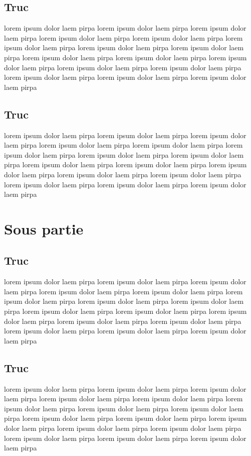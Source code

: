 \documentclass[11pt,fleqn]{book}
\begin{document}
\subsection{Truc}
lorem  ipsum  dolor  laem  pirpa  lorem  ipsum  dolor  laem  pirpa  lorem  ipsum  dolor  laem  pirpa  lorem  ipsum  dolor  laem  pirpa  lorem  ipsum  dolor  laem  pirpa  lorem  ipsum  dolor  laem  pirpa  lorem  ipsum  dolor  laem  pirpa  lorem  ipsum  dolor  laem  pirpa  lorem  ipsum  dolor  laem  pirpa  lorem  ipsum  dolor  laem  pirpa  lorem  ipsum  dolor  laem  pirpa  lorem  ipsum  dolor  laem  pirpa  lorem  ipsum  dolor  laem  pirpa  lorem  ipsum  dolor  laem  pirpa  lorem  ipsum  dolor  laem  pirpa  lorem  ipsum  dolor  laem  pirpa 
~\\
\subsection{Truc}
lorem  ipsum  dolor  laem  pirpa  lorem  ipsum  dolor  laem  pirpa  lorem  ipsum  dolor  laem  pirpa  lorem  ipsum  dolor  laem  pirpa  lorem  ipsum  dolor  laem  pirpa  lorem  ipsum  dolor  laem  pirpa  lorem  ipsum  dolor  laem  pirpa  lorem  ipsum  dolor  laem  pirpa  lorem  ipsum  dolor  laem  pirpa  lorem  ipsum  dolor  laem  pirpa  lorem  ipsum  dolor  laem  pirpa  lorem  ipsum  dolor  laem  pirpa  lorem  ipsum  dolor  laem  pirpa  lorem  ipsum  dolor  laem  pirpa  lorem  ipsum  dolor  laem  pirpa  lorem  ipsum  dolor  laem  pirpa 
~\\
\section{Sous partie}
\subsection{Truc}
lorem  ipsum  dolor  laem  pirpa  lorem  ipsum  dolor  laem  pirpa  lorem  ipsum  dolor  laem  pirpa  lorem  ipsum  dolor  laem  pirpa  lorem  ipsum  dolor  laem  pirpa  lorem  ipsum  dolor  laem  pirpa  lorem  ipsum  dolor  laem  pirpa  lorem  ipsum  dolor  laem  pirpa  lorem  ipsum  dolor  laem  pirpa  lorem  ipsum  dolor  laem  pirpa  lorem  ipsum  dolor  laem  pirpa  lorem  ipsum  dolor  laem  pirpa  lorem  ipsum  dolor  laem  pirpa  lorem  ipsum  dolor  laem  pirpa  lorem  ipsum  dolor  laem  pirpa  lorem  ipsum  dolor  laem  pirpa 
~\\
\subsection{Truc}
lorem  ipsum  dolor  laem  pirpa  lorem  ipsum  dolor  laem  pirpa  lorem  ipsum  dolor  laem  pirpa  lorem  ipsum  dolor  laem  pirpa  lorem  ipsum  dolor  laem  pirpa  lorem  ipsum  dolor  laem  pirpa  lorem  ipsum  dolor  laem  pirpa  lorem  ipsum  dolor  laem  pirpa  lorem  ipsum  dolor  laem  pirpa  lorem  ipsum  dolor  laem  pirpa  lorem  ipsum  dolor  laem  pirpa  lorem  ipsum  dolor  laem  pirpa  lorem  ipsum  dolor  laem  pirpa  lorem  ipsum  dolor  laem  pirpa  lorem  ipsum  dolor  laem  pirpa  lorem  ipsum  dolor  laem  pirpa 
~\\
\end{document}
